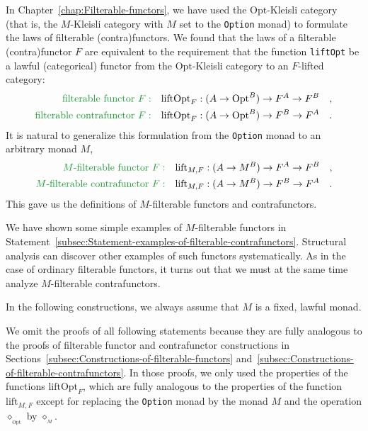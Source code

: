In Chapter~\ref{chap:Filterable-functors}, we have used the $\text{Opt}$-Kleisli
category (that is, the $M$-Kleisli category with $M$ set to the
\lstinline!Option! monad) to formulate the laws of filterable (contra)functors.
We found that the laws of a filterable (contra)functor $F$ are equivalent
to the requirement that the function \lstinline!liftOpt! be a lawful
(categorical) functor from the $\text{Opt}$-Kleisli category to an
$F$-lifted category:
\begin{align*}
{\color{greenunder}\text{filterable functor }F:}\quad & \text{liftOpt}_{F}:(A\rightarrow\text{Opt}^{B})\rightarrow F^{A}\rightarrow F^{B}\quad,\\
{\color{greenunder}\text{filterable contrafunctor }F:}\quad & \text{liftOpt}_{F}:(A\rightarrow\text{Opt}^{B})\rightarrow F^{B}\rightarrow F^{A}\quad.
\end{align*}
It is natural to generalize this formulation from the \lstinline!Option!
monad to an arbitrary monad $M$,
\begin{align*}
{\color{greenunder}M\text{-filterable functor }F:}\quad & \text{lift}_{M,F}:(A\rightarrow M^{B})\rightarrow F^{A}\rightarrow F^{B}\quad,\\
{\color{greenunder}M\text{-filterable contrafunctor }F:}\quad & \text{lift}_{M,F}:(A\rightarrow M^{B})\rightarrow F^{B}\rightarrow F^{A}\quad.
\end{align*}
 This gave us the definitions of $M$-filterable functors and contrafunctors.

We have shown some simple examples of $M$-filterable functors in
Statement~\ref{subsec:Statement-examples-of-filterable-contrafunctors}.
Structural analysis can discover other examples of such functors systematically.
As in the case of ordinary filterable functors, it turns out that
we must at the same time analyze $M$-filterable contrafunctors.

In the following constructions, we always assume that $M$ is a fixed,
lawful monad.

We omit the proofs of all following statements because they are fully
analogous to the proofs of filterable functor and contrafunctor constructions
in Sections~\ref{subsec:Constructions-of-filterable-functors} and~\ref{subsec:Constructions-of-filterable-contrafunctors}.
In those proofs, we only used the properties of the functions $\text{liftOpt}_{F}$,
which are fully analogous to the properties of the function $\text{lift}_{M,F}$
except for replacing the \lstinline!Option! monad by the monad $M$
and the operation $\diamond_{_{\text{Opt}}}$ by $\diamond_{_{M}}$.

